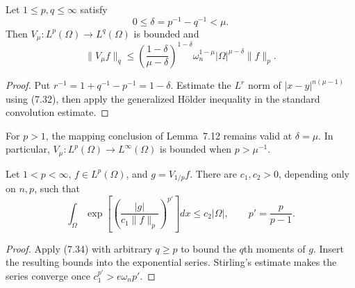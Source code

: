 \begin{lemma}
\label{gt:lem-sobolev-riemann-potential-mapping}
Let $1\leq p,q\leq\infty$ satisfy
\begin{equation}
\tag{7.33}
0\leq\delta=p^{-1}-q^{-1}<\mu.
\end{equation}
Then $V_\mu:L^p(\Omega)\to L^q(\Omega)$ is bounded and
\begin{equation}
\tag{7.34}
\|V_\mu f\|_q
\leq\left(\frac{1-\delta}{\mu-\delta}\right)^{1-\delta}
\omega_n^{1-\mu}|\Omega|^{\mu-\delta}\|f\|_p.
\end{equation}
\end{lemma}
\begin{proof}
\sketch Put $r^{-1}=1+q^{-1}-p^{-1}=1-\delta$. Estimate the
$L^r$ norm of $|x-y|^{n(\mu-1)}$ using (7.32), then apply the generalized
H\"older inequality in the standard convolution estimate.
\end{proof}

\begin{remark}
\label{gt:rem-sobolev-riesz-endpoint}
For $p>1$, the mapping conclusion of Lemma~7.12 remains valid at
$\delta=\mu$. In particular, $V_\mu:L^p(\Omega)\to L^\infty(\Omega)$ is
bounded when $p>\mu^{-1}$.
\end{remark}

\begin{lemma}
\label{gt:lem-sobolev-riemann-potential-exponential}
Let $1<p<\infty$, $f\in L^p(\Omega)$, and $g=V_{1/p}f$. There are
$c_1,c_2>0$, depending only on $n,p$, such that
\begin{equation}
\tag{7.35}
\int_\Omega
\exp\!\left[\left(\frac{|g|}{c_1\|f\|_p}\right)^{p'}\right]dx
\leq c_2|\Omega|,
\qquad p'=\frac p{p-1}.
\end{equation}
\end{lemma}
\begin{proof}
\sketch Apply (7.34) with arbitrary $q\geq p$ to bound the $q$th moments
of $g$. Insert the resulting bounds into the exponential series. Stirling's
estimate makes the series converge once $c_1^{p'}>e\omega_np'$.
\end{proof}


